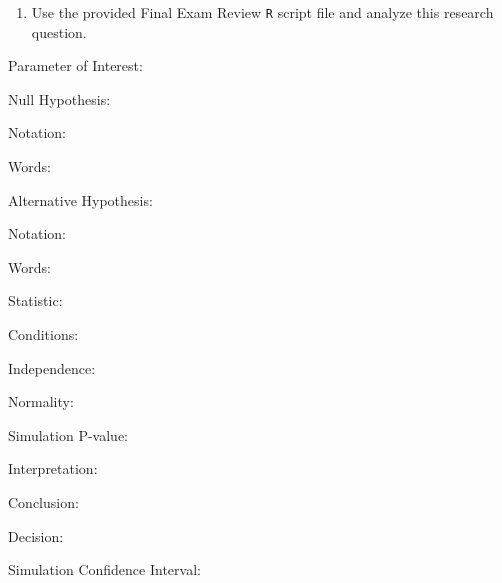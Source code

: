 \documentclass[
]{report}
\providecommand{\tightlist}{%
  \setlength{\itemsep}{0pt}\setlength{\parskip}{0pt}}
\newcommand{\rgi}{\hspace{24pt}}  %
\begin{document}
\vspace{0.8in}

\begin{enumerate}
\def\labelenumi{\arabic{enumi}.}
\setcounter{enumi}{3}
\tightlist
\item
  Use the provided Final Exam Review \texttt{R} script file and analyze this research question.
\end{enumerate}

\rgi Parameter of Interest:

\vspace{0.3in}

\rgi Null Hypothesis:

\rgi \rgi Notation:

\vspace{0.3in}

\rgi \rgi Words:

\vspace{0.5in}

\rgi Alternative Hypothesis:

\rgi \rgi Notation:

\vspace{0.3in}

\rgi \rgi Words:

\vspace{0.5in}

\rgi Statistic:

\vspace{0.3in}

\rgi Conditions:

\rgi \rgi Independence:

\vspace{0.8in}

\rgi \rgi Normality:

\vspace{0.8in}

\rgi Simulation P-value:

\vspace{0.3in}

\rgi \rgi Interpretation:

\vspace{0.8in}

\rgi \rgi Conclusion:

\vspace{0.8in}

\rgi \rgi Decision:

\vspace{0.3in}

\rgi Simulation Confidence Interval:
\end{document}

